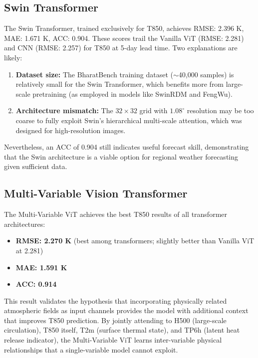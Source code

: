 \documentclass[12pt,a4paper,oneside]{report}
\begin{document}
\subsection{Swin Transformer}

The Swin Transformer, trained exclusively for T850, achieves RMSE: 2.396 K, MAE: 1.671 K, ACC: 0.904. These scores trail the Vanilla ViT (RMSE: 2.281) and CNN (RMSE: 2.257) for T850 at 5-day lead time. Two explanations are likely:

\begin{enumerate}
    \item \textbf{Dataset size:} The BharatBench training dataset ($\sim$40,000 samples) is relatively small for the Swin Transformer, which benefits more from large-scale pretraining (as employed in models like SwinRDM and FengWu).
    \item \textbf{Architecture mismatch:} The $32\times32$ grid with $1.08^\circ$ resolution may be too coarse to fully exploit Swin's hierarchical multi-scale attention, which was designed for high-resolution images.
\end{enumerate}

Nevertheless, an ACC of 0.904 still indicates useful forecast skill, demonstrating that the Swin architecture is a viable option for regional weather forecasting given sufficient data.

\subsection{Multi-Variable Vision Transformer}

The Multi-Variable ViT achieves the best T850 results of all transformer architectures:
\begin{itemize}
    \item \textbf{RMSE: 2.270 K} (best among transformers; slightly better than Vanilla ViT at 2.281)
    \item \textbf{MAE: 1.591 K}
    \item \textbf{ACC: 0.914}
\end{itemize}

This result validates the hypothesis that incorporating physically related atmospheric fields as input channels provides the model with additional context that improves T850 prediction. By jointly attending to H500 (large-scale circulation), T850 itself, T2m (surface thermal state), and TP6h (latent heat release indicator), the Multi-Variable ViT learns inter-variable physical relationships that a single-variable model cannot exploit.
\end{document}
